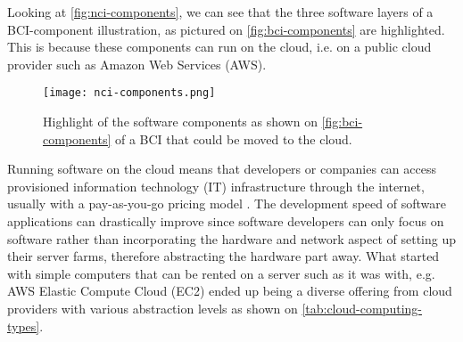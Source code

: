 Looking at \autoref{fig:nci-components}, we can see that the three software layers of a BCI-component illustration, as pictured on \autoref{fig:bci-components} are highlighted. This is because these components can run on the cloud, i.e. on a public cloud provider such as Amazon Web Services (AWS).

\begin{figure}[ht]
  \centering
  \texttt{[image: nci-components.png]}
  \caption{Highlight of the software components as shown on \autoref{fig:bci-components} of a BCI that could be moved to the cloud.}
  \label{fig:nci-components}
\end{figure}

Running software on the cloud means that developers or companies can access provisioned information technology (IT) infrastructure through the internet, usually with a pay-as-you-go pricing model \citep{amazon_web_services_inc_what_nodate}. The development speed of software applications can drastically improve since software developers can only focus on software rather than incorporating the hardware and network aspect of setting up their server farms, therefore abstracting the hardware part away. What started with simple computers that can be rented on a server such as it was with, e.g. AWS Elastic Compute Cloud (EC2) \citep{barr_amazon_2006} ended up being a diverse offering from cloud providers with various abstraction levels as shown on \autoref{tab:cloud-computing-types}.

